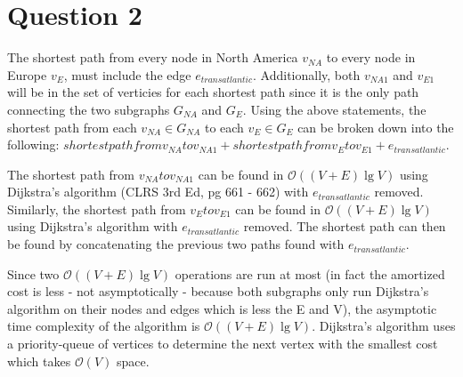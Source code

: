 \section{Question 2}
The shortest path from every node in North America $v_{NA}$ to every node in Europe $v_E$, must include the edge $e_{transatlantic}$.
Additionally, both $v_{NA1}$ and $v_{E1}$ will be in the set of verticies for each shortest path since it is the only path connecting the two subgraphs $G_{NA}$ and $G_{E}$.
\linebreak
Using the above statements, the shortest path from each $v_{NA} \in G_{NA}$ to each $v_E \in G_E$ can be broken down into the following:
$shortest path from v_{NA} to v_{NA1} + shortest path from v_E to v_{E1} + e_{transatlantic}$.
\linebreak

The shortest path from $v_{NA} to v_{NA1}$ can be found in $\mathcal{O}((V + E)\lg{V})$ using Dijkstra's algorithm (CLRS 3rd Ed, pg 661 - 662) with $e_{transatlantic}$ removed.
Similarly, the shortest path from $v_{E} to v_{E1}$ can be found in $\mathcal{O}((V + E)\lg{V})$ using Dijkstra's algorithm with $e_{transatlantic}$ removed.
The shortest path can then be found by concatenating the previous two paths found with $e_{transatlantic}$.

Since two $\mathcal{O}((V + E)\lg{V})$ operations are run at most (in fact the amortized cost is less - not asymptotically - because 
both subgraphs only run Dijkstra's algorithm on their nodes and edges which is less the E and V), the asymptotic time complexity of the algorithm is $\mathcal{O}((V + E)\lg{V})$.
Dijkstra's algorithm uses a priority-queue of vertices to determine the next vertex with the smallest cost which takes $\mathcal{O}(V)$ space.